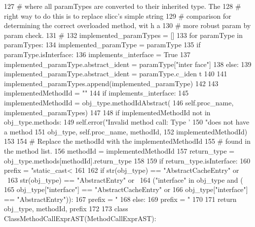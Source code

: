 \begin{DoxyCode}
127                   # where all paramTypes are converted to their inherited type.  
      The
128                   # right way to do this is to replace slicc's simple string
129                   # comparison for determining the correct overloaded method, wit
      h a
130                   # more robust param by param check.
131                   #
132                   implemented_paramTypes = []
133                   for paramType in paramTypes:
134                       implemented_paramType = paramType
135                       if paramType.isInterface:
136                           implements_interface = True
137                           implemented_paramType.abstract_ident = paramType["inter
      face"]
138                       else:
139                           implemented_paramType.abstract_ident = paramType.c_iden
      t
140 
141                       implemented_paramTypes.append(implemented_paramType)
142 
143                   implementedMethodId = ""
144                   if implements_interface:
145                       implementedMethodId = obj_type.methodIdAbstract(
146                               self.proc_name, implemented_paramTypes)
147 
148                   if implementedMethodId not in obj_type.methods:
149                       self.error("Invalid method call: Type '%
150                                  "does not have a method %
151                                  obj_type, self.proc_name, methodId,
152                                  implementedMethodId)
153 
154                   # Replace the methodId with the implementedMethodId
155                   # found in the method list.
156                   methodId = implementedMethodId
157                   return_type = obj_type.methods[methodId].return_type
158 
159         if return_type.isInterface:
160             prefix = "static_cast<%
161 
162         if str(obj_type) == "AbstractCacheEntry" or \
163            str(obj_type) == "AbstractEntry" or \
164            ("interface" in obj_type and (
165             obj_type["interface"] == "AbstractCacheEntry" or
166             obj_type["interface"] == "AbstractEntry")):
167             prefix = "%
168         else:
169             prefix = "%
170 
171         return obj_type, methodId, prefix
172 
173 
class ClassMethodCallExprAST(MethodCallExprAST):
\end{DoxyCode}


